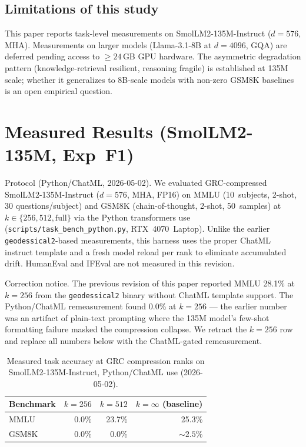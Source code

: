 \documentclass[11pt]{article}
\begin{document}
\subsection{Limitations of this study}
This paper reports task-level measurements on SmolLM2-135M-Instruct
($d{=}576$, MHA).  Measurements on larger models (Llama-3.1-8B at
$d{=}4096$, GQA) are deferred pending access to $\ge 24$\,GB GPU
hardware.  The asymmetric degradation pattern (knowledge-retrieval
resilient, reasoning fragile) is established at 135M scale; whether it
generalizes to 8B-scale models with non-zero GSM8K baselines is an
open empirical question.

\section{Measured Results (SmolLM2-135M, Exp~F1)}
\label{sec:measured-f1}

Protocol (Python/ChatML, 2026-05-02).  We evaluated
GRC-compressed SmolLM2-135M-Instruct ($d{=}576$, MHA, FP16) on MMLU
(10~subjects, 2-shot, 30 questions/subject) and GSM8K (chain-of-thought,
2-shot, 50~samples) at $k\in\{256,512,\text{full}\}$ via the Python
transformers use (\texttt{scripts/task\_bench\_python.py},
RTX~4070~Laptop).  Unlike the earlier \texttt{geodessical2}-based
measurements, this harness uses the proper ChatML instruct template
and a fresh model reload per rank to eliminate accumulated drift.
HumanEval and IFEval are not measured in this revision.

Correction notice.  The previous revision of this paper reported
MMLU 28.1\% at $k{=}256$ from the \texttt{geodessical2} binary without
ChatML template support.  The Python/ChatML remeasurement found
0.0\% at $k{=}256$ --- the earlier number was an artifact of
plain-text prompting where the 135M model's few-shot formatting failure
masked the compression collapse.  We retract the $k{=}256$ row and
replace all numbers below with the ChatML-gated remeasurement.

\begin{table}[h]\centering\small
\caption{Measured task accuracy at GRC compression ranks on
SmolLM2-135M-Instruct, Python/ChatML use (2026-05-02).}
\label{tab:f1-measured}
\begin{tabular}{@{}lrrr@{}}
\toprule
Benchmark & $k{=}256$ & $k{=}512$ & $k{=}\infty$ (baseline) \\
\midrule
MMLU   & 0.0\%  & 23.7\% & 25.3\% \\
GSM8K  & 0.0\%  & 0.0\%  & ${\sim}2.5\%$ \\
\bottomrule
\end{tabular}
\end{table}
\end{document}
